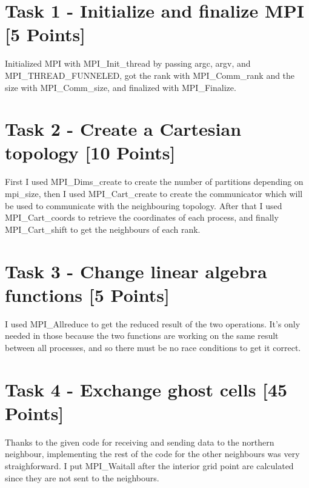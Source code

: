 \documentclass[unicode,11pt,a4paper,oneside,numbers=endperiod,openany]{scrartcl}
\begin{document}
\setassignment
{}

\newline


\section{Task 1 - Initialize and finalize MPI [5 Points]}

Initialized MPI with MPI\_Init\_thread by passing argc, argv, and MPI\_THREAD\_FUNNELED, got the rank with MPI\_Comm\_rank and the size with MPI\_Comm\_size, and finalized with MPI\_Finalize.

\section{Task 2 - Create a Cartesian topology [10 Points]}

First I used MPI\_Dims\_create to create the number of partitions depending on mpi\_size, then I used MPI\_Cart\_create to create the communicator which will be used to communicate with the neighbouring topology. After that I used MPI\_Cart\_coords to retrieve the coordinates of each process, and finally MPI\_Cart\_shift to get the neighbours of each rank.

\section{Task 3 - Change linear algebra functions [5 Points]}

I used MPI\_Allreduce to get the reduced result of the two operations. It's only needed in those because the two functions are working on the same result between all processes, and so there must be no race conditions to get it correct.

\section{Task 4 - Exchange ghost cells [45 Points]}

Thanks to the given code for receiving and sending data to the northern neighbour, implementing the rest of the code for the other neighbours was very straighforward.
\newline
I put MPI\_Waitall after the interior grid point are calculated since they are not sent to the neighbours.
\end{document}
